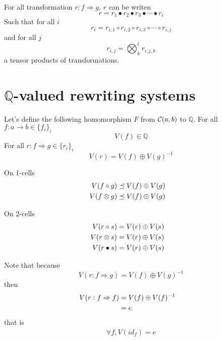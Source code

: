 \documentclass[a4paper]{article}
\begin{document}
\begin{corollary}
For all transformation $r: f \Rightarrow g$, $r$ can be writen
\[
r = r_1 \bullet r_2 \bullet r_3 \bullet \cdots \bullet r_i
\]
Such that for all $i$
\[
r_i = r_{i, 1} \circ r_{i, 2} \circ r_{i, 3} \circ \cdots \circ r_{i, j}
\]
and for all $j$
\[
r_{i, j} = \bigotimes_k^l r_{i, j, k}
\]
a tensor products of transformations.
\end{corollary}


\section{$\mathbb{Q}$-valued rewriting systems}

\begin{definition}
Let's define the following homomorphism $F$ from ${\cal C}(a, b)$ to $\mathbb{Q}$. For all $f: a \to b \in \{f_i\}_i$
\[
V(f) \in \mathbb{Q}
\]
For all $r: f \Rightarrow g \in \{r_i\}_i$
\[
V(r) = V(f) \oplus V(g)^{-1}
\]

On 1-cells
\begin{align}
V(f \circ g) &\preceq V(f) \oplus V(g) \cr
V(f \otimes g) &\preceq V(f) \oplus V(g)
\end{align}

On 2-cells
\begin{align}
V(r \circ s) &= V(r) \oplus V(s) \cr
V(r \otimes s) &= V(r) \oplus V(s) \cr
V(r \bullet s) &= V(r) \oplus V(s)
\end{align}
\end{definition}

\begin{remark}
Note that because
\[
V(r: f \Rightarrow g) = V(f) \oplus V(g)^{-1}
\]
then
\begin{align}
V(r: f \Rightarrow f) &= V(f) \oplus V(f)^{-1} \cr
&= e
\end{align}
that is
\begin{align}
\forall f, V(id_f) = e
\end{align}
\end{remark}
\end{document}
